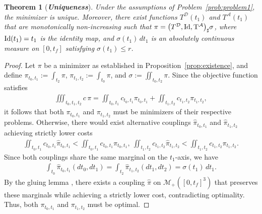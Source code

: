 \documentclass[11pt]{article}
\newcommand{\A}{\mathcal A}
\newcommand{\D}{\mathcal D}
\newtheorem{theorem}{Theorem}
\begin{document}
\begin{theorem}[\bf \textit{Uniqueness}]\label{thm:unique1}
Under the assumptions of Problem~\ref{prob:problem1}, the minimizer is unique. Moreover, there exist functions $T^\D(t_1)$ and $T^\A(t_1)$ that are monotonically non-increasing such that $\pi = \big(T^\D, {\rm Id, T^\A}\big)_{\sharp}\sigma$,
where ${\rm Id}(t_1) = t_1$ is the identity map, and $\sigma(t_1)\,dt_1$ is an absolutely continuous measure on $[0,t_f]$ satisfying $\sigma(t_1) \leq r$.
\end{theorem}

\begin{proof}
Let $\pi$ be a minimizer as established in Proposition~\ref{prop:existence}, and define $\pi_{t_0,t_1} := \int_{t_2} \pi$, $\pi_{t_1,t_2} := \int_{t_0} \pi$, and $\sigma := \iint_{t_0,t_2} \pi$. Since the objective function satisfies
\begin{align*}
\iiint_{t_0,t_1,t_2} \!\!\!\!\!\!\!\! c \, \pi
= \iint_{t_0,t_1} \!\!\!\!\! c_{t_0,t_1} \pi_{t_0,t_1} +
\iint_{t_1,t_2} \!\!\!\!\!\!\! c_{t_1,t_2} \pi_{t_1,t_2},
\end{align*}
it follows that both $\pi_{t_0,t_1}$ and $\pi_{t_1,t_2}$ must be minimizers of their respective problems. Otherwise, there would exist alternative couplings $\hat\pi_{t_0,t_1}$ and $\hat\pi_{t_1,t_2}$ achieving strictly lower costs
\begin{align*}
\iint_{t_0,t_1} c_{t_0,t_1} \hat\pi_{t_0,t_1} < \iint_{t_0,t_1} c_{t_0,t_1} \pi_{t_0,t_1}, \ \iint_{t_1,t_2} c_{t_1,t_2} \hat\pi_{t_1,t_2} < \iint_{t_1,t_2} c_{t_1,t_2} \pi_{t_1,t_2}.
\end{align*}
Since both couplings share the same marginal on the $t_1$-axis, we have
\begin{align*}
\int_{t_0} \hat\pi_{t_0,t_1}(dt_0, dt_1) = \int_{t_2} \hat\pi_{t_1,t_2}(dt_1, dt_2) = \sigma(t_1)\,dt_1.
\end{align*}
By the gluing lemma \cite[page 11]{villani2009optimal}, there exists a coupling $\hat\pi$ on $\mathcal{M}_+([0, t_f]^3)$ that preserves these marginals while achieving a strictly lower cost, contradicting optimality. Thus, both $\pi_{t_0,t_1}$ and $\pi_{t_1,t_2}$ must be optimal.


\end{proof}
\end{document}
